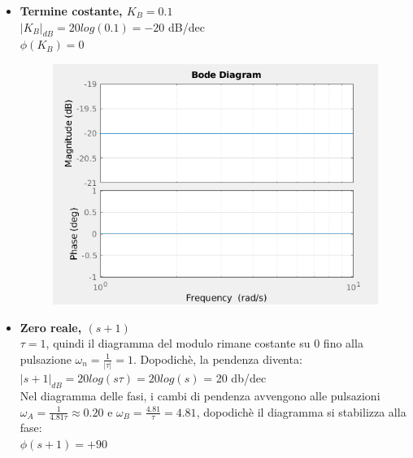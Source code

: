 \documentclass[12pt,a4paper]{article}
\begin{document}
	\begin{itemize}
		\item \textbf{Termine costante, $K_B = 0.1$}\vspace{5px}\\
		$|K_B|_{dB} = 20log(0.1) = -20$ dB/dec\\
		$\phi(K_B) = 0$\degree
		\begin{figure}[h!]
			\centering
			\includegraphics[scale=0.5]{./images/bode43_1.png}
		\end{figure}
		\newpage
		\item \textbf{Zero reale, $(s+1)$}\vspace{5px}\\
		$\tau = 1$, quindi il diagramma del modulo rimane costante su 0 fino alla pulsazione $\omega_n = \frac{1}{|\tau|} = 1$. Dopodich\`e, la pendenza diventa:\vspace{5px}\\
		$|s+1|_{dB} = 20log(s\tau) = 20log(s)$ = 20 db/dec\vspace{5px}\\
		Nel diagramma delle fasi, i cambi di pendenza avvengono alle pulsazioni $\omega_A = \frac{1}{4.81\tau} \approx 0.20$ e $\omega_B = \frac{4.81}{\tau} = 4.81$, dopodich\`e il diagramma si stabilizza alla fase:\vspace{5px}\\
		$\phi(s+1) = +90$\degree
		\begin{figure}[h!]
			\centering

\end{figure}
\end{itemize}
\end{document}
